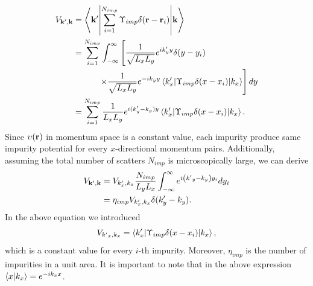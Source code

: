 \documentclass[
 reprint,
 amsmath,amssymb,
 aps,
 prb,
]{revtex4-2}
\begin{document}
\begin{subequations} \label{eq:c24}
\begin{align}
 V_{\vb{k'},\vb{k}} & =
 \mel**{\vb{k'}}{\sum_{i=1}^{N_{imp}}
 \Upsilon_{imp} \delta(\vb{r}-\vb{r}_i)}{\vb{k}} \label{eq:c24a} \\
 & =
 \sum_{i=1}^{N_{imp}}
 \int_{-\infty}^{\infty} \left[
 \frac{1}{\sqrt{L_xL_y}} e^{ik'_y y} \delta(y-y_i) \nonumber \right. \\
 & \left. \qquad\quad\times
 \frac{1}{\sqrt{L_xL_y}} e^{-i{k}_y y}
 \mel**{k'_x}{\Upsilon_{imp} \delta(x-x_i)}{k_x} \right] dy \label{eq:c24b} \\
  & =
 \sum_{i=1}^{N_{imp}} \frac{1}{{L_xL_y}}
 e^{i(k'_y - k_y )y}
 \mel**{k'_x}{\Upsilon_{imp} \delta(x-x_i)}{k_x} \label{eq:c24c}.
\end{align}
\end{subequations}
Since $\upsilon (\vb{r})$ in momentum space is a constant value, each impurity  produce same impurity potential for every $x$-directional momentum pairs. Additionally, assuming the total number of scatters $N_{imp}$ is microscopically large, we can derive
\begin{subequations} \label{eq:c25}
  \begin{align}
    V_{\vb{k'},\vb{k}}
    & =
    V_{k'_x,k_x}
    \frac{N_{imp}}{L_y L_x} \int_{-\infty}^{\infty}
    e^{i\left({k'}_y - k_y \right)y_i} dy_i \label{eq:c25a} \\
    & =
    \eta_{imp} V_{k'_x,k_x} \delta(k'_y - k_y). \label{eq:c25b}
  \end{align}
\end{subequations}
In the above equation we introduced
\begin{equation} \label{eq:c26}
  V_{{k'}_x,k_x} =
  \mel**{k'_x}{\Upsilon_{imp} \delta(x-x_i)}{k_x},
\end{equation}
which is a constant value for every $i$-th impurity. Moreover, $\eta_{imp}$ is the number of impurities in a unit area. It is important to note that in the above expression $\braket{x}{k_x} = e^{-ik_xx}$.
\end{document}

